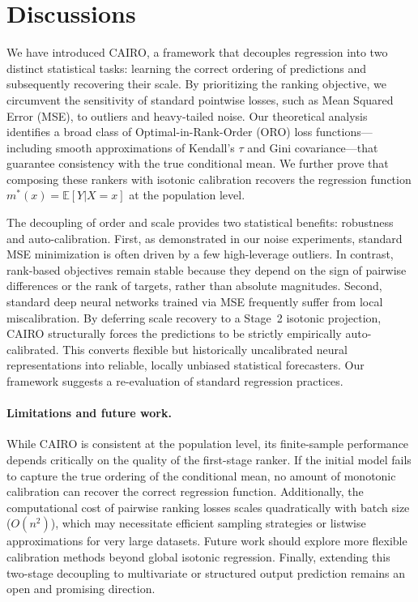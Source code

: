 \documentclass[11pt]{article}
\theoremstyle{plain}
\theoremstyle{plain}
\theoremstyle{plain}
\theoremstyle{plain}
\theoremstyle{plain}
\theoremstyle{plain}
\theoremstyle{plain}
\begin{document}
\section{Discussions}

We have introduced \textsc{CAIRO}, a framework that decouples regression into two distinct statistical tasks: learning the correct ordering of predictions and subsequently recovering their scale. By prioritizing the ranking objective, we circumvent the sensitivity of standard pointwise losses, such as Mean Squared Error (MSE), to outliers and heavy-tailed noise. Our theoretical analysis identifies a broad class of Optimal-in-Rank-Order (ORO) loss functions---including smooth approximations of Kendall's $\tau$ and Gini covariance---that guarantee consistency with the true conditional mean. We further prove that composing these rankers with isotonic calibration recovers the regression function $m^*(x) = \mathbb{E}[Y|X=x]$ at the population level. 

The decoupling of order and scale provides two statistical benefits: robustness and auto-calibration. First, as demonstrated in our noise experiments, standard MSE minimization is often driven by a few high-leverage outliers. In contrast, rank-based objectives remain stable because they depend on the sign of pairwise differences or the rank of targets, rather than absolute magnitudes. Second, standard deep neural networks trained via MSE frequently suffer from local miscalibration. By deferring scale recovery to a Stage~2 isotonic projection, \textsc{CAIRO} structurally forces the predictions to be strictly empirically auto-calibrated. This converts flexible but historically uncalibrated neural representations into reliable, locally unbiased statistical forecasters. Our framework suggests a re-evaluation of standard regression practices.



\paragraph{Limitations and future work.} While CAIRO is consistent at the population level, its finite-sample performance depends critically on the quality of the first-stage ranker. If the initial model fails to capture the true ordering of the conditional mean, no amount of monotonic calibration can recover the correct regression function. Additionally, the computational cost of pairwise ranking losses scales quadratically with batch size ($O(n^2)$), which may necessitate efficient sampling strategies or listwise approximations for very large datasets. Future work should explore more flexible calibration methods beyond global isotonic regression.   Finally, extending this two-stage decoupling to multivariate or structured output prediction remains an open and promising direction.
 
\end{document}
